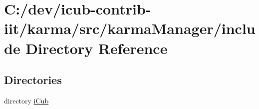 \section{C\+:/dev/icub-\/contrib-\/iit/karma/src/karma\+Manager/include Directory Reference}
\label{dir_db5aab25642573dc60c61c7a424e232a}
\subsection*{Directories}
\begin{DoxyCompactItemize}
\item 
directory \hyperlink{dir_0485f0c3e5fc27f1b21a0a793d715761}{i\+Cub}
\end{DoxyCompactItemize}
